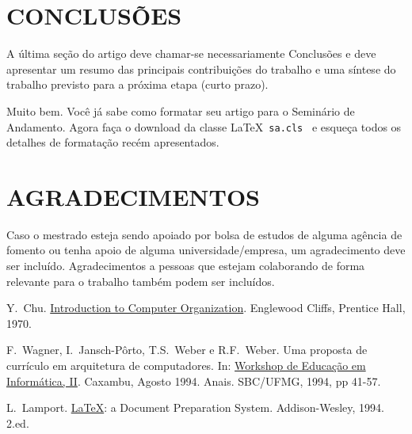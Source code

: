 \documentclass{sa}
\begin{document}
\section{CONCLUSÕES}
A última seção do artigo deve chamar-se necessariamente Conclusões e deve 
apresentar um resumo das principais contribuições do trabalho e uma síntese do 
trabalho previsto para a próxima etapa (curto prazo).

Muito bem. Você já sabe como formatar seu artigo para o Seminário de Andamento. Agora faça o download da classe \LaTeX\ \texttt{sa.cls}~\cite{lamport} e esqueça todos os detalhes de formatação recém apresentados.
\section*{AGRADECIMENTOS}
Caso o mestrado esteja sendo apoiado por bolsa de estudos de alguma agência 
de fomento ou tenha apoio de alguma universidade/empresa, um agradecimento 
deve ser incluído. Agradecimentos a pessoas que estejam colaborando de 
forma relevante para o trabalho também podem ser incluídos.
\begin{thebibliography}{10}
Y.~Chu. \underline{Introduction to Computer Organization}. Englewood Cliffs, 
Prentice Hall, 1970.

 F.~Wagner, I.~Jansch-Pôrto, T.S.~Weber e R.F.~Weber. 
Uma proposta de currículo em arquitetura de computadores. In:
\underline{Workshop de Educação em Informática, II}. Caxambu, Agosto 1994. 
Anais. SBC/UFMG, 1994, pp 41-57.

 L.~Lamport. \underline{\LaTeX}: a Document Preparation System. Addison-Wesley, 1994. 2.ed.
\end{thebibliography}
\end{document}
